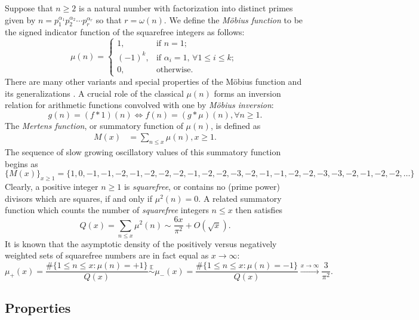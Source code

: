 \documentclass[11pt,reqno,a4letter]{article}
\numberwithin{figure}{section}
\numberwithin{table}{section}
\newcommand{\cf}{\textit{cf.\ }}
\newcommand{\seqnum}[1]{\href{http://oeis.org/#1}{\color{ProcessBlue}{\underline{#1}}}}
\theoremstyle{plain}
\numberwithin{theorem}{section}
\theoremstyle{definition}
\begin{document}
Suppose that $n \geq 2$ is a natural number with factorization into 
distinct primes given by 
$n = p_1^{\alpha_1} p_2^{\alpha_2} \cdots p_r^{\alpha_r}$ so that $r = \omega(n)$. 
We define the \emph{M\"obius function} to be the signed indicator function 
of the squarefree integers as follows: 
\[
\mu(n) = \begin{cases} 
     1, & \text{if $n = 1$; } \\ 
     (-1)^k, & \text{if $\alpha_i = 1$, $\forall 1 \leq i \leq k$; } \\ 
     0, & \text{otherwise.} 
     \end{cases} 
\]
There are many other variants and special properties of the M\"obius function 
and its generalizations \cite[\cf \S 2]{HANDBOOKNT-2004}. 
A crucial role of the classical $\mu(n)$ forms an inversion relation 
for arithmetic functions convolved with one by \emph{M\"obius inversion}: 
\[
g(n) = (f \ast 1)(n) \iff f(n) = (g \ast \mu)(n), \forall n \geq 1. 
\]
The \emph{Mertens function}, or summatory function of $\mu(n)$, is defined as 
\begin{align*} 
M(x) & = \sum_{n \leq x} \mu(n), x \geq 1. 
\end{align*} 
The sequence of slow growing oscillatory values of this summatory function begins as 
\cite[\seqnum{A002321}]{OEIS} 
\[
\{M(x)\}_{x \geq 1} = \{1, 0, -1, -1, -2, -1, -2, -2, -2, -1, -2, -2, -3, -2, 
     -1, -1, -2, -2, -3, -3, -2, -1, -2, -2, \ldots\}
\]
Clearly, a positive integer $n \geq 1$ is \emph{squarefree}, or contains no (prime power) divisors which are 
squares, if and only if $\mu^2(n) = 0$. 
A related summatory function which counts the 
number of \emph{squarefree} integers $n \leq x$ then satisfies 
\cite[\S 18.6]{HARDYWRIGHT} \cite[\seqnum{A013928}]{OEIS} 
\[ 
Q(x) = \sum_{n \leq x} \mu^2(n) \sim \frac{6x}{\pi^2} + O\left(\sqrt{x}\right). 
\] 
It is known that the asymptotic density of the positively versus negatively 
weighted sets of squarefree numbers are in fact equal as $x \rightarrow \infty$: 
\[
\mu_{+}(x) = \frac{\#\{1 \leq n \leq x: \mu(n) = +1\}}{Q(x)} \overset{\mathbb{E}}{\sim} 
     \mu_{-}(x) = \frac{\#\{1 \leq n \leq x: \mu(n) = -1\}}{Q(x)} 
     \xrightarrow{x \rightarrow \infty} \frac{3}{\pi^2}. 
\]

\subsection{Properties} 
\end{document}
